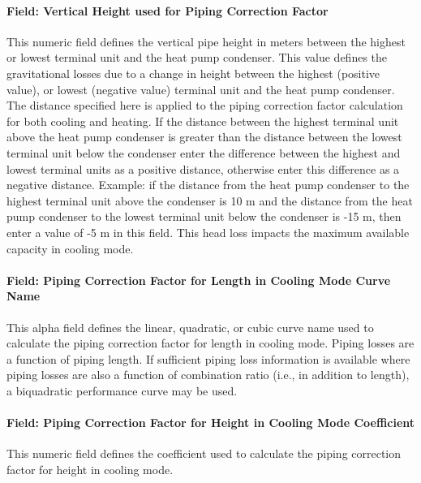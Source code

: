 \paragraph{Field: Vertical Height used for Piping Correction Factor}\label{field-vertical-height-used-for-piping-correction-factor-000}

This numeric field defines the vertical pipe height in meters between the highest or lowest terminal unit and the heat pump condenser. This value defines the gravitational losses due to a change in height between the highest (positive value), or lowest (negative value) terminal unit and the heat pump condenser. The distance specified here is applied to the piping correction factor calculation for both cooling and heating. If the distance between the highest terminal unit above the heat pump condenser is greater than the distance between the lowest terminal unit below the condenser enter the difference between the highest and lowest terminal units as a positive distance, otherwise enter this difference as a negative distance. Example: if the distance from the heat pump condenser to the highest terminal unit above the condenser is 10 m and the distance from the heat pump condenser to the lowest terminal unit below the condenser is -15 m, then enter a value of -5 m in this field. This head loss impacts the maximum available capacity in cooling mode.

\paragraph{Field: Piping Correction Factor for Length in Cooling Mode Curve Name}\label{field-piping-correction-factor-for-length-in-cooling-mode-curve-name}

This alpha field defines the linear, quadratic, or cubic curve name used to calculate the piping correction factor for length in cooling mode. Piping losses are a function of piping length. If sufficient piping loss information is available where piping losses are also a function of combination ratio (i.e., in addition to length), a biquadratic performance curve may be used.

\paragraph{Field: Piping Correction Factor for Height in Cooling Mode Coefficient}\label{field-piping-correction-factor-for-height-in-cooling-mode-coefficient}

This numeric field defines the coefficient used to calculate the piping correction factor for height in cooling mode.

